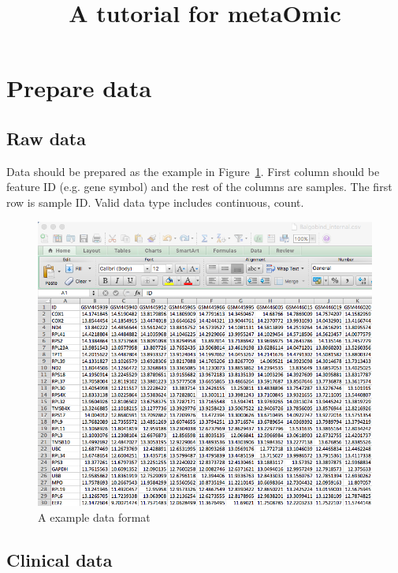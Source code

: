 \documentclass{article}
\title{A tutorial for metaOmic}
\author{}
\date{ }
\begin{document}
 
\maketitle
 
\tableofcontents
 
 
 
 
 
\section{Prepare data}
\subsection{Raw data}

Data should be prepared as the example in Figure~\ref{fig:dataMicroarray}.
First column should be feature ID (e.g. gene symbol) and the rest of the columns are samples.
The first row is sample ID.
Valid data type includes continuous, count.

\begin{figure}[htbp]
\begin{center}
\includegraphics[scale=0.5]{./figure/dataMicroarray}
\caption{A example data format}
\label{fig:dataMicroarray}
\end{center}
\end{figure}

\subsection{Clinical data}
\end{document}

